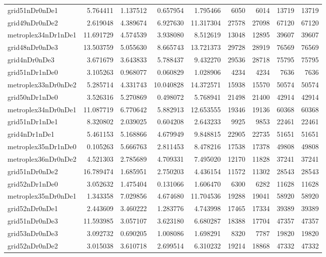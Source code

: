 \begin{longtable}{|l|r|r|r|r|r|r|r|r|}
grid51nDr0nDe1 & 5.764411 & 1.137512 & 0.657954 & 1.795466 & 6050 & 6014 & 13719 & 13719 \\
grid49nDr0nDe2 & 2.619048 & 4.389674 & 6.927630 & 11.317304 & 27578 & 27098 & 67120 & 67120 \\
metroplex34nDr1nDe1 & 11.691729 & 4.574539 & 3.938080 & 8.512619 & 13048 & 12895 & 39607 & 39607 \\
grid48nDr0nDe3 & 13.503759 & 5.055630 & 8.665743 & 13.721373 & 29728 & 28919 & 76569 & 76569 \\
grid4nDr0nDe3 & 3.671679 & 3.643833 & 5.788437 & 9.432270 & 29536 & 28718 & 75795 & 75795 \\
grid51nDr1nDe0 & 3.105263 & 0.968077 & 0.060829 & 1.028906 & 4234 & 4234 & 7636 & 7636 \\
metroplex33nDr0nDe2 & 5.285714 & 4.331743 & 10.040828 & 14.372571 & 15938 & 15570 & 50574 & 50574 \\
grid50nDr1nDe0 & 3.526316 & 5.270869 & 0.498072 & 5.768941 & 21498 & 21400 & 42914 & 42914 \\
metroplex34nDr0nDe1 & 11.087719 & 6.770642 & 5.882913 & 12.653555 & 19346 & 19136 & 60368 & 60368 \\
grid51nDr1nDe1 & 8.320802 & 2.039025 & 0.604208 & 2.643233 & 9925 & 9853 & 22461 & 22461 \\
grid4nDr1nDe1 & 5.461153 & 5.168866 & 4.679949 & 9.848815 & 22905 & 22735 & 51651 & 51651 \\
metroplex35nDr1nDe0 & 0.105263 & 5.666763 & 2.811453 & 8.478216 & 17538 & 17378 & 49808 & 49808 \\
metroplex36nDr0nDe2 & 4.521303 & 2.785689 & 4.709331 & 7.495020 & 12170 & 11828 & 37241 & 37241 \\
grid51nDr0nDe2 & 16.789474 & 1.685951 & 2.750203 & 4.436154 & 11572 & 11302 & 28543 & 28543 \\
grid52nDr1nDe0 & 3.052632 & 1.475404 & 0.131066 & 1.606470 & 6300 & 6282 & 11628 & 11628 \\
metroplex35nDr0nDe1 & 1.343358 & 7.029856 & 4.674680 & 11.704536 & 19288 & 19041 & 58920 & 58920 \\
grid52nDr0nDe1 & 2.443609 & 3.460222 & 1.283776 & 4.743998 & 17465 & 17334 & 39389 & 39389 \\
grid51nDr0nDe3 & 11.593985 & 3.057107 & 3.623180 & 6.680287 & 18388 & 17704 & 47357 & 47357 \\
grid53nDr0nDe3 & 3.092732 & 0.690205 & 1.008086 & 1.698291 & 8320 & 7787 & 19820 & 19820 \\
grid52nDr0nDe2 & 3.015038 & 3.610718 & 2.699514 & 6.310232 & 19214 & 18868 & 47332 & 47332 \\

\end{longtable}
